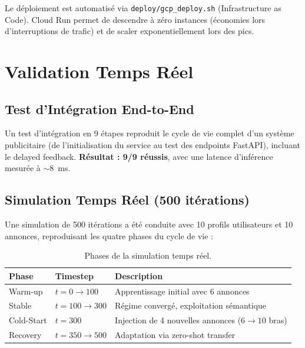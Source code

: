 Le déploiement est automatisé via \texttt{deploy/gcp\_deploy.sh} (Infrastructure as Code). Cloud Run permet de descendre à zéro instances (économies lors d'interruptions de trafic) et de scaler exponentiellement lors des pics.

\section{Validation Temps Réel}
\label{sec:validation_temps_reel_ch4}

\subsection{Test d'Intégration End-to-End}

Un test d'intégration en 9 étapes reproduit le cycle de vie complet d'un système publicitaire (de l'initialisation du service au test des endpoints FastAPI), incluant le delayed feedback. \textbf{Résultat : 9/9 réussis}, avec une latence d'inférence mesurée à $\sim 8$~ms.

\subsection{Simulation Temps Réel (500 itérations)}

Une simulation de 500 itérations a été conduite avec 10 profils utilisateurs et 10 annonces, reproduisant les quatre phases du cycle de vie :

\begin{table}[H]
    \centering
    \begin{tabular}{l l L{7cm}}
        \toprule
        \textbf{Phase} & \textbf{Timestep} & \textbf{Description} \\
        \midrule
        Warm-up    & $t = 0 \to 100$   & Apprentissage initial avec 6 annonces \\
        Stable     & $t = 100 \to 300$ & Régime convergé, exploitation sémantique \\
        Cold-Start & $t = 300$          & Injection de 4 nouvelles annonces ($6 \to 10$ bras) \\
        Recovery   & $t = 350 \to 500$ & Adaptation via zero-shot transfer \\
        \bottomrule
    \end{tabular}
    \caption{Phases de la simulation temps réel.}
    \label{tab:phases_sim_ch4}
\end{table}

